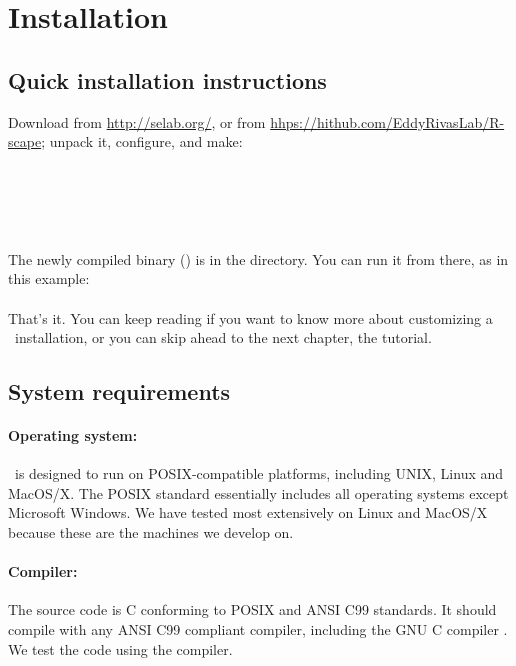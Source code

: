 \section{Installation}
\label{section:installation}
\setcounter{footnote}{0}

\subsection{Quick installation instructions}

Download  from
\url{http://selab.org/}, or from
\url{hhps://hithub.com/EddyRivasLab/R-scape}; unpack it, configure,
and make:\\

\\
\\
\\ 
\\
\\

The newly compiled binary (\prog{\rscape}) is in the
 directory. You can run it from there,
as in this example:\\

\\


That's it.  You can keep reading if you want to know more about
customizing a \rscape\ installation, or you can skip ahead to the next
chapter, the tutorial.


\subsection{System requirements}

\paragraph{Operating system:} \rscape\ is designed to run on
POSIX-compatible platforms, including UNIX, Linux and MacOS/X. The
POSIX standard essentially includes all operating systems except
Microsoft Windows. We have tested most extensively on Linux and
MacOS/X because these are the machines we develop on.

\paragraph{Compiler:} The source code is C conforming to POSIX and ANSI
C99 standards. It should compile with any ANSI C99 compliant compiler,
including the GNU C compiler . We test the code using the
 compiler.

